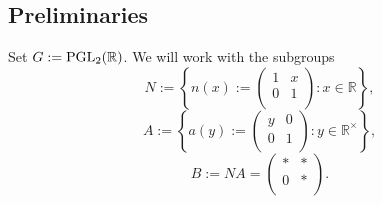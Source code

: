 \documentclass[reqno]{amsart} 
\numberwithin{equation}{section}
\begin{document}
\subsection{Preliminaries}\label{sec:d1a9162e9385}
Set $G := \operatorname{PGL}_2(\mathbb{R})$.  We will work with the subgroups
\begin{equation*}
  N := \left\{ n(x) :=
    \begin{pmatrix}
      1 & x \\
      0 & 1 \\
    \end{pmatrix} : x \in \mathbb{R}  \right\},
\end{equation*}
\begin{equation*}
  A :=
  \left\{   a(y) := 
    \begin{pmatrix}
      y  & 0 \\
      0 & 1 \\
    \end{pmatrix} : y \in \mathbb{R}^\times  \right\},
\end{equation*}
\begin{equation*}
  B := N A
  =
  \begin{pmatrix}
    \ast & \ast \\
    0 & \ast \\
  \end{pmatrix}.  
\end{equation*}
\end{document}
